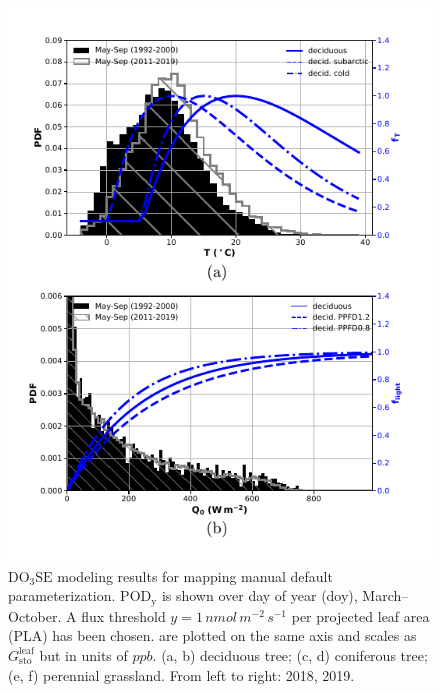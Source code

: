 \documentclass[bg, manuscript]{copernicus}
\begin{document}
\begin{figure}[t]
  \includegraphics[width=12cm]{figB4}
  \caption{$\mathrm{DO_3SE}$ modeling results for mapping manual default parameterization. $\mathrm{POD_y}$ is shown over day of year (\unit{doy}), March--October. A flux threshold $y=1\,\unit{nmol\,m^{-2}\,s^{-1}}$ per projected leaf area (PLA) has been chosen. \chem{[O_3]} are plotted on the same axis and scales as $G_\text{sto}^\text{leaf}$ but in units of $\unit{ppb}$. (a, b) deciduous tree; (c, d) coniferous tree; (e, f) perennial grassland. From left to right: 2018, 2019.}
  \label{fig:pody_mm_composit}
\end{figure}

\clearpage

\noappendix       %


\end{document}
